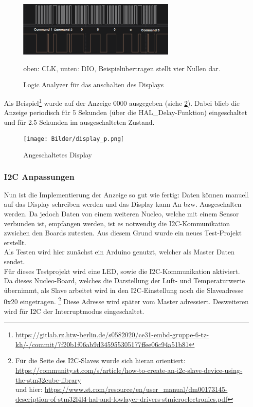 \documentclass[11pt,a4paper,titlepage]{article}
\begin{document}
\vspace{1cm}
\begin{figure}[h]
    \begin{center}
        \includegraphics[width=0.7\textwidth]{Bilder/display_on_2.png}
        \caption{Logic Analyzer für das anschalten des Displays}
        {\small oben: CLK, unten: DIO, Beispielübertragen stellt vier Nullen dar.}
        \label{display_on}
    \end{center}
\end{figure}

\newpage

Als Beispiel\footnote{\url{https://gitlab.rz.htw-berlin.de/s0582020/ce31-embd-gruppe-6-tz-kh/-/commit/7f20b1f06ab9d345955305177ffee06c94a51b81}}
wurde auf der Anzeige 0000 ausgegeben (siehe \cref{display}).
Dabei blieb die Anzeige periodisch für 5 Sekunden (über die HAL\_Delay-Funktion) eingeschaltet 
und für 2.5 Sekunden im ausgeschalteten Zustand.

\vspace{1cm}
\begin{figure}[h]
    \begin{center}
        \texttt{[image: Bilder/display\_p.png]}
        \caption{Angeschaltetes Display}
        \label{display}
    \end{center}
\end{figure}


\subsubsection{I2C Anpassungen}
Nun ist die Implementierung der Anzeige so gut wie fertig:
Daten können manuell auf das Display schreiben werden und das Display kann An bzw. Ausgeschalten werden.
Da jedoch Daten von einem weiteren Nucleo, welche mit einem Sensor verbunden ist,
empfangen werden, ist es notwendig die I2C-Kommunikation zwsichen den Boards zutesten.
Aus diesem Grund wurde ein neues Test-Projekt erstellt.\\
Als Testen wird hier zunächst ein Arduino genutzt, welcher als Master Daten sendet.\\

Für dieses Testprojekt wird eine LED, sowie die I2C-Kommunikation aktiviert.
Da dieses Nucleo-Board, welches die Darstellung der Luft- und Temperaturwerte übernimmt, 
als Slave arbeitet wird in den I2C-Einstellung noch die Slaveadresse 0x20 eingetragen.
\footnote{Für die Seite des I2C-Slaves wurde sich hieran orientiert: \url{https://community.st.com/s/article/how-to-create-an-i2c-slave-device-using-the-stm32cube-library}\\
und hier: \url{https://www.st.com/resource/en/user_manual/dm00173145-description-of-stm32l4l4-hal-and-lowlayer-drivers-stmicroelectronics.pdf}}
Diese Adresse wird später vom Master adressiert.
Desweiteren wird für I2C der Interruptmodus eingeschaltet.\\
\end{document}
